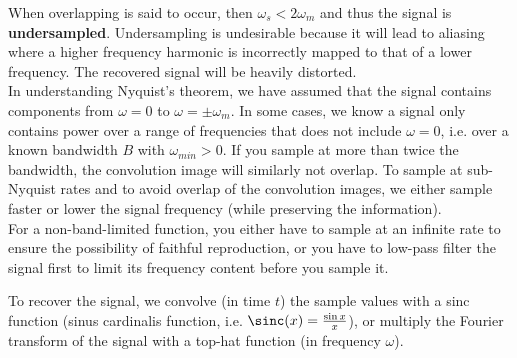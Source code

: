 \documentclass[a4paper]{article}
\begin{document}
\begin{Note}[Undersampling]
When overlapping is said to occur, then $\omega_s<2\omega_m$ and thus the signal is \textbf{undersampled}. Undersampling is undesirable because it will lead to aliasing where a higher frequency harmonic is incorrectly mapped to that of a lower frequency. The recovered signal will be heavily distorted.\\[5pt]
In understanding Nyquist's theorem, we have assumed that the signal contains components from $\omega=0$ to $\omega=\pm\omega_m$. In some cases, we know a signal only contains power over a range of frequencies that does not include $\omega=0$, i.e. over a known bandwidth $B$ with $\omega_{min}>0$. If you sample at more than twice the bandwidth, the convolution image will similarly not overlap. To sample at sub-Nyquist rates and to avoid overlap of the convolution images, we either sample faster or lower the signal frequency (while preserving the information).\\[5pt]
For a non-band-limited function, you either have to sample at an infinite rate to ensure the possibility of faithful reproduction, or you have to low-pass filter the signal first to limit its frequency content before you sample it.
\end{Note}
\begin{Note}
To recover the signal, we convolve (in time $t$) the sample values with a sinc function (sinus cardinalis function, i.e. $\sinc(x)=\frac{\sin x}{x}$), or multiply the Fourier transform of the signal with a top-hat function (in frequency $\omega$).
\end{Note}
\end{document}
